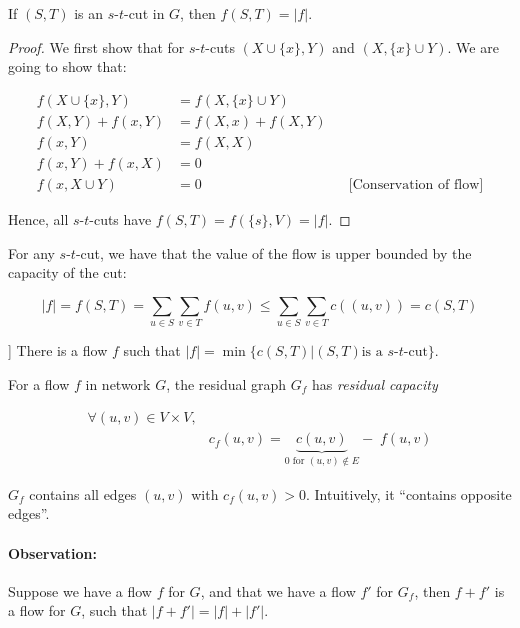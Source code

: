 \begin{mylemma}
If $(S,T)$ is an $s$-$t$-cut in $G$, then $f(S,T) = |f|$.
\end{mylemma}
\begin{proof}
We first show that for $s$-$t$-cuts $(X \cup \{x\}, Y)$ and $(X, \{x\} \cup Y)$.
We are going to show that:

\begin{align*}
f(X \cup \{x\}, Y) &= f(X, \{x\}\cup Y) \\
f(X,Y) + f(x,Y) &= f(X,x) + f(X,Y) \\
f(x,Y) &= f(X,X) \\
f(x,Y) + f(x,X) &= 0 \\
f(x, X \cup Y) &= 0 && \text{[Conservation of flow]}
\end{align*}

Hence, all $s$-$t$-cuts have $f(S,T) = f(\{s\},V) = |f|$.
\end{proof}

\begin{mycorollary}
For any $s$-$t$-cut, we have that the value of the flow is upper bounded by the capacity of the cut:

$$|f| = f(S,T) = \sum_{u \in S} \sum_{v \in T} f(u,v) \le \sum_{u \in S} \sum_{v \in T} c((u,v)) = c(S,T)$$
\end{mycorollary}

\begin{mytheorem}[Max-Flow-Min-Cut [Ford \& Fulkerson]]
There is a flow $f$ such that $|f| = \min \{c(S,T) | (S,T) \text{is a $s$-$t$-cut}\}$.
\end{mytheorem}

\begin{mydefinition}
For a flow $f$ in network $G$, the residual graph $G_f$ has \emph{residual capacity}

\begin{align*}
\forall (u,v) \in V \times V, \\
& c_f(u,v) = \underbrace{c(u,v)}_{\text{$0$ for $(u,v) \notin E$}} - \; f(u,v)
\end{align*}
\end{mydefinition}

$G_f$ contains all edges $(u,v)$ with $c_f(u,v) > 0$. Intuitively, it  ``contains opposite edges''.

\paragraph{Observation:} Suppose we have a flow $f$ for $G$, and that we have a flow $f'$ for $G_f$, then $f + f'$ is a flow for $G$, such that $|f + f'| = |f| + |f'|$.

